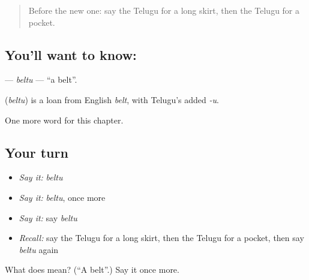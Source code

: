 \begin{quote}
Before the new one: say the Telugu for a long skirt, then the Telugu for a pocket.
\end{quote}

\subsection*{You'll want to know: }
\textbf{} — \emph{beltu} — \textquotedblleft{}a belt\textquotedblright{}.

\begin{cousinweb}
\textbf{} (\emph{beltu}) is a loan from English \emph{belt}, with Telugu's added \emph{-u}.
\end{cousinweb}

\begin{grammarlens}[title={What you've built}]
One more word for this chapter.
\end{grammarlens}

\subsection*{Your turn}
\begin{itemize}
\raggedright
  \item \emph{Say it:} \emph{beltu}
  \item \emph{Say it:} \emph{beltu}, once more
  \item \emph{Say it:} say \emph{beltu}
  \item \emph{Recall:} say the Telugu for a long skirt, then the Telugu for a pocket, then say \emph{beltu} again
\end{itemize}

\begin{tcolorbox}[breakable,colback=teal!4,colframe=teal!35!black,title={Before you move on}]
What does  mean? (\textquotedblleft{}A belt\textquotedblright{}.) Say it once more.
\end{tcolorbox}
